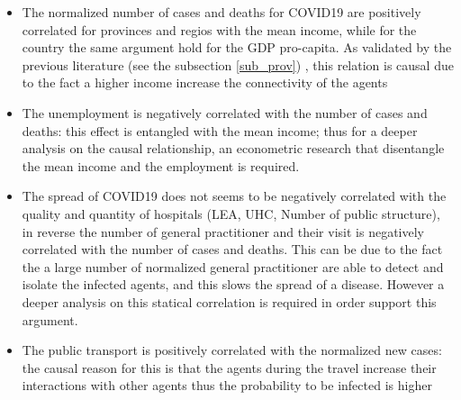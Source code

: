 \documentclass[
12pt, %
a4paper, %
oneside, %
headinclude,footinclude, %
BCOR5mm, %
]{scrartcl}
\begin{document}
\begin{itemize}
\item The normalized number of cases and deaths for COVID19 are positively correlated for provinces and regios with the mean income, while for the country the same argument hold for the GDP pro-capita. As validated by the previous literature (see the subsection \ref{sub_prov}) , this relation is causal due to the fact a higher income increase the connectivity of the agents
\item The unemployment is negatively correlated with the number of cases and deaths: this effect is entangled with the mean income; thus for a deeper analysis on the causal relationship, an econometric research that disentangle the mean income and the employment is required. 
\item The spread of COVID19 does not seems to be negatively correlated with the quality and quantity of hospitals (LEA, UHC, Number of public structure), in reverse the number of general practitioner and their visit is negatively correlated with the number of cases and deaths. This can be due to the fact the a large number of normalized general practitioner are able to detect and isolate the infected agents, and this slows the spread of a disease. However a deeper analysis on this statical correlation is required in order support this argument. 
\item The public transport is positively correlated with the normalized new cases: the causal reason for this is that the agents during the travel increase their interactions with other agents thus the probability to be infected is higher
\end{itemize}
\end{document}

